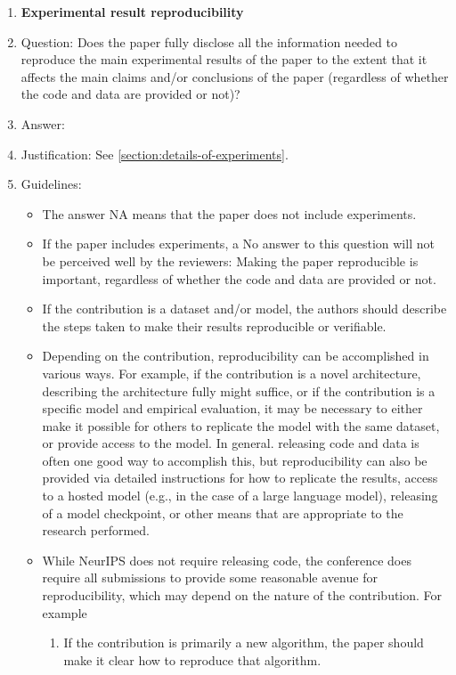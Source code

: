 \documentclass{article}
\theoremstyle{plain}
\theoremstyle{remark}
\begin{document}
\begin{enumerate}
    \item {\bf Experimental result reproducibility}
    \item[] Question: Does the paper fully disclose all the information needed to reproduce the main experimental results of the paper to the extent that it affects the main claims and/or conclusions of the paper (regardless of whether the code and data are provided or not)?
    \item[] Answer: \answerYes{} %
    \item[] Justification: See \cref{section:details-of-experiments}.
    \item[] Guidelines:
    \begin{itemize}
        \item The answer NA means that the paper does not include experiments.
        \item If the paper includes experiments, a No answer to this question will not be perceived well by the reviewers: Making the paper reproducible is important, regardless of whether the code and data are provided or not.
        \item If the contribution is a dataset and/or model, the authors should describe the steps taken to make their results reproducible or verifiable. 
        \item Depending on the contribution, reproducibility can be accomplished in various ways. For example, if the contribution is a novel architecture, describing the architecture fully might suffice, or if the contribution is a specific model and empirical evaluation, it may be necessary to either make it possible for others to replicate the model with the same dataset, or provide access to the model. In general. releasing code and data is often one good way to accomplish this, but reproducibility can also be provided via detailed instructions for how to replicate the results, access to a hosted model (e.g., in the case of a large language model), releasing of a model checkpoint, or other means that are appropriate to the research performed.
        \item While NeurIPS does not require releasing code, the conference does require all submissions to provide some reasonable avenue for reproducibility, which may depend on the nature of the contribution. For example
        \begin{enumerate}
            \item If the contribution is primarily a new algorithm, the paper should make it clear how to reproduce that algorithm.

\end{enumerate}
\end{itemize}
\end{enumerate}
\end{document}

